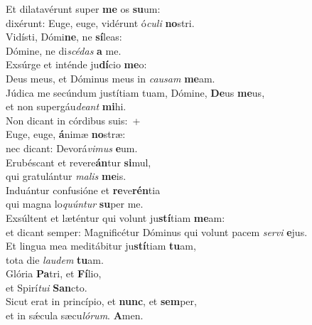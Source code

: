 \evenverse Et dilatavérunt super \textbf{me} os \textbf{su}um:~\*\\
\evenverse dixérunt: Euge, euge, vidérunt ó\textit{cu}\textit{li} \textbf{no}stri.\\
\oddverse Vidísti, Dómi\textbf{ne}, ne \textbf{sí}leas:~\*\\
\oddverse Dómine, ne di\textit{scé}\textit{das} \textbf{a} me.\\
\evenverse Exsúrge et inténde ju\textbf{dí}cio \textbf{me}o:~\*\\
\evenverse Deus meus, et Dóminus meus in \textit{cau}\textit{sam} \textbf{me}am.\\
\oddverse Júdica me secúndum justítiam tuam, Dómine, \textbf{De}us \textbf{me}us,~\*\\
\oddverse et non supergáu\textit{de}\textit{ant} \textbf{mi}hi.\\
\evenverse Non dicant in córdibus suis:~+\\
\evenverse  Euge, euge, \textbf{á}nimæ \textbf{no}stræ:~\*\\
\evenverse nec dicant: Devorá\textit{vi}\textit{mus} \textbf{e}um.\\
\oddverse Erubéscant et revere\textbf{án}tur \textbf{si}mul,~\*\\
\oddverse qui gratulántur \textit{ma}\textit{lis} \textbf{me}is.\\
\evenverse Induántur confusióne et \textbf{re}ve\textbf{rén}tia~\*\\
\evenverse qui magna lo\textit{quún}\textit{tur} \textbf{su}per me.\\
\oddverse Exsúltent et læténtur qui volunt ju\textbf{stí}tiam \textbf{me}am:~\*\\
\oddverse et dicant semper: Magnificétur Dóminus qui volunt pacem \textit{ser}\textit{vi} \textbf{e}jus.\\
\evenverse Et lingua mea meditábitur ju\textbf{stí}tiam \textbf{tu}am,~\*\\
\evenverse tota die \textit{lau}\textit{dem} \textbf{tu}am.\\
\oddverse Glória \textbf{Pa}tri, et \textbf{Fí}lio,~\*\\
\oddverse et Spirí\textit{tu}\textit{i} \textbf{San}cto.\\
\evenverse Sicut erat in princípio, et \textbf{nunc}, et \textbf{sem}per,~\*\\
\evenverse et in sǽcula sæcu\textit{ló}\textit{rum}. \textbf{A}men.\\
